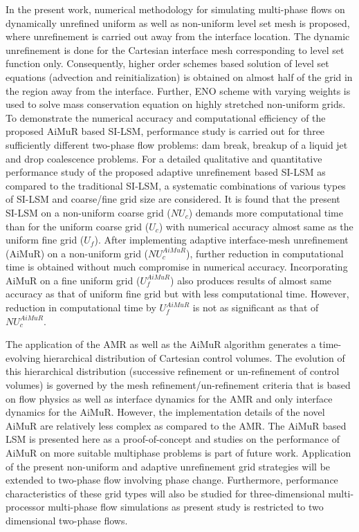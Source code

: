 \documentclass[preprint,12pt]{elsarticle}
\newcommand{\review}[1]{\color{black}#1}
\begin{document}
In the present work, numerical methodology for simulating multi-phase flows on dynamically
unrefined uniform as well as non-uniform level set mesh is proposed,
where unrefinement is carried out away from the interface location.
The dynamic unrefinement is done for the Cartesian interface mesh corresponding to level set function only. Consequently,
higher order schemes based solution of level set equations (advection
and reinitialization) is obtained on almost half of the grid in the
region away from the interface. Further, ENO scheme
with varying weights is used to solve mass conservation equation on
highly stretched non-uniform grids. To demonstrate the numerical accuracy and
computational efficiency of the proposed AiMuR based SI-LSM, performance study
is carried out for three sufficiently different two-phase flow problems: dam break, breakup of a liquid jet and drop coalescence
problems. For a detailed qualitative and quantitative performance study of the proposed adaptive unrefinement based SI-LSM as compared to the traditional SI-LSM, a systematic combinations of various types of SI-LSM and coarse/fine grid size are considered. It is found that the present SI-LSM on a non-uniform coarse grid ($NU_{c}$) demands more computational
time than for the uniform coarse grid ($U_{c}$) with numerical accuracy
almost same as the uniform fine grid ($U_{f}$). After implementing
adaptive interface-mesh unrefinement (AiMuR) on a non-uniform grid ($NU_{c}^{AiMuR}$),
further reduction in computational time is obtained without much compromise
in numerical accuracy. Incorporating AiMuR on a fine uniform grid ($U_{f}^{AiMuR}$)
also produces results of almost same accuracy as that of uniform fine grid but with
less computational time. However, reduction in computational time
by $U_{f}^{AiMuR}$ is not as significant as that of $NU_{c}^{AiMuR}$.


\review{The application of the AMR as well as the AiMuR algorithm generates a time-evolving hierarchical distribution of Cartesian control volumes. The evolution of this hierarchical distribution (successive refinement or un-refinement of control volumes) is governed by the mesh refinement/un-refinement criteria that is based on flow physics as well as interface dynamics for the AMR and only interface dynamics for the AiMuR. However, the implementation details of the novel AiMuR are relatively less complex as compared to the AMR. The AiMuR based LSM is presented here as a proof-of-concept and studies on the performance of AiMuR on more suitable multiphase problems is part of future work.} Application of the present non-uniform and adaptive unrefinement grid strategies will be extended
to two-phase flow involving phase change. Furthermore, performance characteristics of these grid types
will also be studied for three-dimensional multi-processor multi-phase flow simulations as present study is restricted to two dimensional two-phase flows.
\end{document}
